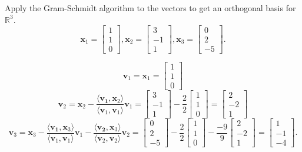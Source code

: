 \documentclass[11pt]{exam}
\newcommand{\inner}[1]{\langle {#1} \rangle}
\newcommand{\R}{\mathbb{R}}
\begin{document}
\begin{questions}
\question Apply the Gram-Schmidt algorithm to the vectors to get an orthogonal basis for $\R^3$. 
$$\mathbf{x}_1 = \begin{bmatrix} 1 \\ 1 \\ 0 \end{bmatrix}, \mathbf{x}_2 = \begin{bmatrix} 3 \\ -1 \\ 1 \end{bmatrix}, \mathbf{x}_3 = \begin{bmatrix} 0 \\ 2 \\ -5 \end{bmatrix}.$$
\begin{solution}
$$\mathbf{v}_1 = \mathbf{x}_1 = \begin{bmatrix} 1 \\ 1 \\ 0 \end{bmatrix}$$
$$\mathbf{v}_2 = \mathbf{x}_2 - \frac{\inner{\mathbf{v_1}, \mathbf{x}_2}}{\inner{\mathbf{v}_1, \mathbf{v}_1}} \mathbf{v}_1 = \begin{bmatrix} 3 \\ -1 \\ 1 \end{bmatrix} - \frac{2}{2} \begin{bmatrix} 1 \\ 1 \\ 0 \end{bmatrix} = \begin{bmatrix} 2 \\ -2 \\ 1 \end{bmatrix}$$
$$\mathbf{v}_3 = \mathbf{x}_3 - \frac{\inner{\mathbf{v_1}, \mathbf{x}_3}}{\inner{\mathbf{v}_1, \mathbf{v}_1}} \mathbf{v}_1 -  \frac{\inner{\mathbf{v_2}, \mathbf{x}_3}}{\inner{\mathbf{v}_2, \mathbf{v}_2}} \mathbf{v}_2 = \begin{bmatrix} 0 \\ 2 \\ -5 \end{bmatrix} - \frac{2}{2} \begin{bmatrix} 1 \\ 1 \\ 0 \end{bmatrix}  - \frac{-9}{9} \begin{bmatrix} 2 \\ -2 \\ 1 \end{bmatrix} = \begin{bmatrix} 1 \\ -1 \\ -4 \end{bmatrix}.$$
\end{solution}
\vfill
\vfill


\end{questions}
\end{document}
